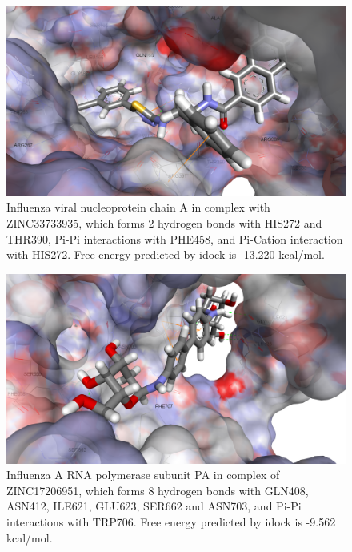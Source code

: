 \begin{figure}
\centering
\includegraphics[width=\linewidth]{../influenza/2IQH-ZINC33733935.png}
\caption{Influenza viral nucleoprotein chain A in complex with ZINC33733935, which forms 2 hydrogen bonds with HIS272 and THR390, Pi-Pi interactions with PHE458, and Pi-Cation interaction with HIS272. Free energy predicted by idock is -13.220 kcal/mol.}
\label{influenza:2IQH-ZINC33733935}
\end{figure}

\begin{figure}
\centering
\includegraphics[width=\linewidth]{../influenza/2ZNL-ZINC17206951.png}
\caption{Influenza A RNA polymerase subunit PA in complex of ZINC17206951, which forms 8 hydrogen bonds with GLN408, ASN412, ILE621, GLU623, SER662 and ASN703, and Pi-Pi interactions with TRP706. Free energy predicted by idock is -9.562 kcal/mol.}
\label{influenza:2ZNL-ZINC17206951}
\end{figure}

